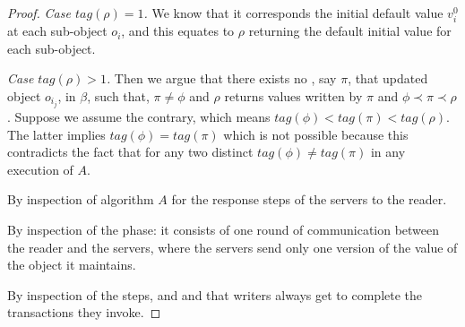 {\begin{proof}
	\emph{Case $tag(\rho) = 1$.} We  know that it corresponds the initial default value $v_i^0$ at each sub-object $o_i$, and this equates to $\rho$ returning the default initial value for each sub-object.
	 
	 \emph{Case $tag(\rho) > 1$.} Then we argue that there exists no \wot{}, say $\pi$, that updated object $o_{i_j}$,   in $\beta$, such that,  $\pi \neq \phi$ and $\rho$ returns values written by $\pi$ and $\phi \prec \pi \prec \rho$. Suppose we assume the 	contrary, which means $tag(\phi) < tag(\pi) < tag(\rho)$. The latter implies $tag(\phi)  = tag(\pi)$ which is not possible because 
	this contradicts the fact that for any two distinct \wots{} $tag(\phi) \neq tag(\pi)$  in any execution of   $A$.
	
	  By inspection of algorithm $A$ for the  response steps  of the servers to the reader.
	
	 By inspection of the  {\readValue} phase: it consists of one round of communication between the reader and the servers, where the servers send only one version of the value of the object it maintains.
	
	  By inspection of the \wot{} steps, and  and  that writers always get to complete the transactions they invoke.
	\end{proof}
}


